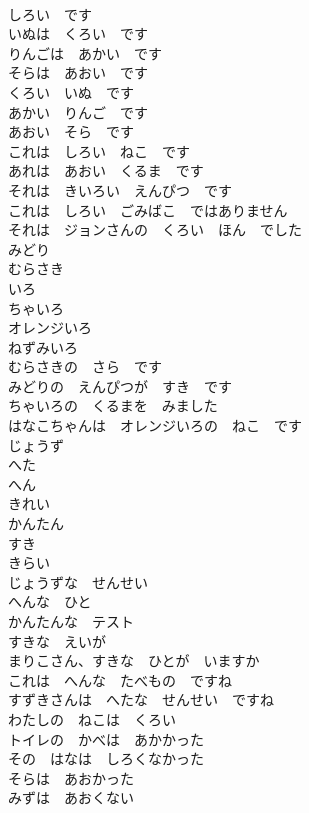 \documentclass[8pt]{extreport}
\begin{document}
\begin{CJK}{UTF8}{min}
\\	しろい　です	
\\	いぬは　くろい　です	
\\	りんごは　あかい　です	
\\	そらは　あおい　です	
\\	くろい　いぬ　です	
\\	あかい　りんご　です	
\\	あおい　そら　です	
\\	これは　しろい　ねこ　です	
\\	あれは　あおい　くるま　です	
\\	それは　きいろい　えんぴつ　です	
\\	これは　しろい　ごみばこ　ではありません	
\\	それは　ジョンさんの　くろい　ほん　でした	
\\	みどり	
\\	むらさき	
\\	いろ	
\\	ちゃいろ	
\\	オレンジいろ	
\\	ねずみいろ	
\\	むらさきの　さら　です	
\\	みどりの　えんぴつが　すき　です	
\\	ちゃいろの　くるまを　みました	
\\	はなこちゃんは　オレンジいろの　ねこ　です	
\\	じょうず	
\\	へた	
\\	へん	
\\	きれい	
\\	かんたん	
\\	すき	
\\	きらい	
\\	じょうずな　せんせい	
\\	へんな　ひと	
\\	かんたんな　テスト	
\\	すきな　えいが	
\\	まりこさん、すきな　ひとが　いますか	
\\	これは　へんな　たべもの　ですね	
\\	すずきさんは　へたな　せんせい　ですね	
\\	わたしの　ねこは　くろい	
\\	トイレの　かべは　あかかった	
\\	その　はなは　しろくなかった	
\\	そらは　あおかった	
\\	みずは　あおくない	

\end{CJK}
\end{document}
